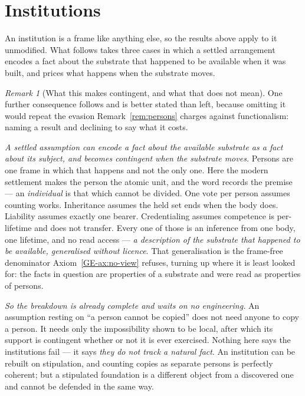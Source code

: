 \documentclass[11pt,a4paper]{article}
\theoremstyle{remark}
\newtheorem{remark}[definition]{Remark}
\begin{document}
\section{Institutions}\label{sec:institutions}
An institution is a frame like anything else, so the results above apply to it unmodified. What
follows takes three cases in which a settled arrangement encodes a fact about the substrate that
happened to be available when it was built, and prices what happens when the substrate moves.

\begin{remark}[What this makes contingent, and what that does not mean]\label{rem:contingent}
One further consequence follows and is better stated than left, because omitting it would repeat the
evasion Remark~\ref{rem:persons} charges against functionalism: naming a result and declining to say
what it costs.

\emph{A settled assumption can encode a fact about the available substrate as a fact about its subject,
and becomes contingent when the substrate moves.} Persons are one frame in which that happens and not
the only one. Here the modern settlement makes the person the atomic unit, and the word records the premise ---
an \emph{individual} is that which cannot be divided. One vote per person assumes counting works.
Inheritance assumes the held set ends when the body does. Liability assumes exactly one bearer.
Credentialing assumes competence is per-lifetime and does not transfer. Every one of those is an
inference from one body, one lifetime, and no read access --- \emph{a description of the substrate that
happened to be available, generalised without licence}. That generalisation is the frame-free
denominator Axiom~\ref{GE-ax:no-view} refuses, turning up where it is least looked for: the facts in question are
properties of a substrate and were read as properties of persons.

\emph{So the breakdown is already complete and waits on no engineering.} An assumption resting on ``a
person cannot be copied'' does not need anyone to copy a person. It needs only the impossibility shown
to be local, after which its support is contingent whether or not it is ever exercised. Nothing here
says the institutions fail --- it says \emph{they do not track a natural fact}. An institution can be
rebuilt on stipulation, and counting copies as separate persons is perfectly coherent; but a stipulated
foundation is a different object from a discovered one and cannot be defended in the same way.


\end{remark}
\end{document}
